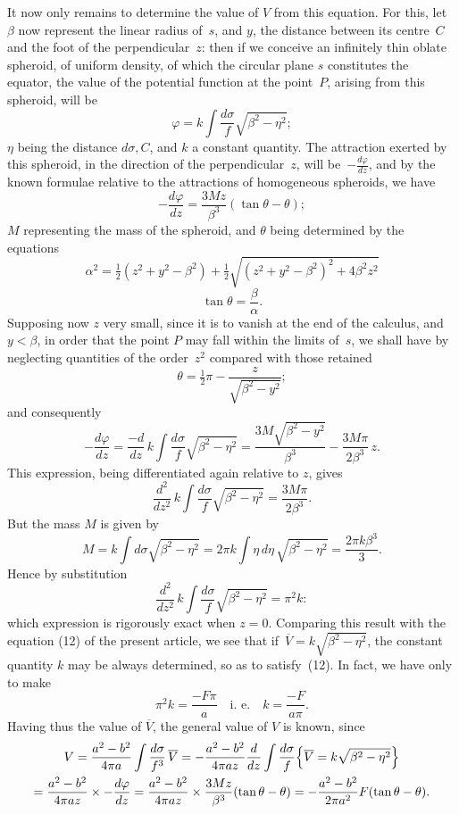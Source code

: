 \documentclass[11pt,notitlepage]{amsart}
\renewcommand{\phi}{\varphi}
\begin{document}
It now only remains to determine the value of $V$ from this equation.
For this, let $\beta$ now represent the linear radius of~$s$,
and $y$, the distance
between its centre~$C$ and the foot of the perpendicular~$z$:
then if we conceive
an infinitely thin oblate spheroid, of uniform density, of which the circular
plane $s$ constitutes the equator, the value of the potential function at the
point~$P$, arising from this spheroid, will be
\[
\phi=k\int\frac{d\sigma}{f}\sqrt{\beta^2-\eta^2};
\]
$\eta$ being the distance $d\sigma,C$, and $k$ a constant quantity.
The attraction exerted
by this spheroid, in the direction of the perpendicular~$z$,
will be~$-\frac{d\phi}{dz}$, and
by the known formulae relative to the attractions of homogeneous spheroids,
we have
\[
-\frac{d\phi}{dz}=\frac{3Mz}{\beta^3}(\tan\theta-\theta);
\]
$M$ representing the mass of the spheroid,
and $\theta$ being determined by the
equations
\[
\alpha^2=\tfrac12(z^2+y^2-\beta^2)
+\tfrac12\sqrt{(z^2+y^2-\beta^2)^2+4\beta^2z^2}
\]
\[
\tan\theta=\frac\beta\alpha.
\]
Supposing now $z$ very small, since it is to vanish at the end of the calculus,
and~$y<\beta$, in order that the point $P$ may fall within the limits of~$s$,
we shall
have by neglecting quantities of the order~$z^2$ compared with those retained
\[
\theta=\tfrac12\pi-\frac{z}{\sqrt{\beta^2-y^2}};
\]
and consequently
\[
-\frac{d\phi}{dz}
=\frac{-d}{dz}\,k\int\frac{d\sigma}{f}\sqrt{\beta^2-\eta^2}
=\frac{3M\sqrt{\beta^2-y^2}}{\beta^3}-\frac{3M\pi}{2\beta^3}\,z.
\]
This expression, being differentiated again relative to $z$, gives
\[
\frac{d^2}{dz^2}\,k\int\frac{d\sigma}{f}\sqrt{\beta^2-\eta^2}
=\frac{3M\pi}{2\beta^3}.
\]
But the mass $M$ is given by
\[
M=k\int d\sigma\sqrt{\beta^2-\eta^2}
=2\pi k\int \eta\,d\eta\,\sqrt{\beta^2-\eta^2}
=\frac{2\pi k\beta^3}{3}.
\]
Hence by substitution
\[
\frac{d^2}{dz^2}\,k\int\frac{d\sigma}{f}\sqrt{\beta^2-\eta^2}
=\pi^2k:
\]
which expression is rigorously exact when $z=0$. Comparing this result
with the equation (12) of the present article, we see that
if~$\overline{V}=k\sqrt{\beta^2-\eta^2}$,
the constant quantity $k$ may be always determined, so as to satisfy~(12).
In fact, we have only to make
\[
\pi^2k=\frac{-F\pi}{a}
\quad\text{i.~e.}\quad
k=\frac{-F}{a\pi}.
\]
Having thus the value of $\overline{V}$,
the general value of $V$ is known, since
\begin{multline*}
V=\frac{a^2-b^2}{4\pi a}\int\frac{d\sigma}{f^3}\,\overline{V}
=-\frac{a^2-b^2}{4\pi az}\frac{d}{dz}\int\frac{d\sigma}{f}
\Bigl\{\overline{V}=k\sqrt{\beta^2-\eta^2}\Bigr\}\\
=\frac{a^2-b^2}{4\pi az}\times-\frac{d\phi}{dz}
=\frac{a^2-b^2}{4\pi az}\times\frac{3Mz}{\beta^3}(\tan\theta-\theta)
=-\frac{a^2-b^2}{2\pi a^2}F(\tan\theta-\theta).
\end{multline*}
\end{document}
